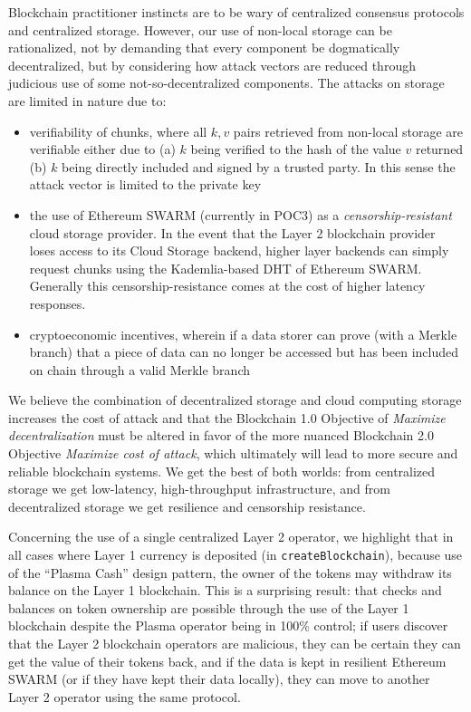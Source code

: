 \documentclass{article}
\begin{document}
Blockchain practitioner instincts are to be wary of centralized consensus protocols and centralized storage.  However, our use of non-local storage can be rationalized, not by demanding that every component be  dogmatically decentralized, but by considering how attack vectors are reduced through judicious use of some not-so-decentralized components.  The attacks on storage are limited in nature due to:
\begin{itemize}
\item verifiability of chunks, where all $k,v$ pairs retrieved from non-local storage are verifiable either due to (a) $k$ being verified to the hash of the value $v$ returned (b) $k$ being directly included and signed by a trusted party.  In this sense the attack vector is limited to the private key
\item the use of Ethereum SWARM (currently in POC3) as a {\em censorship-resistant} cloud storage provider.  In the event that the Layer 2 blockchain provider loses access to its Cloud Storage backend, higher layer backends can simply request chunks using the Kademlia-based DHT of Ethereum SWARM.  Generally this censorship-resistance comes at the cost of higher latency responses.
\item cryptoeconomic incentives, wherein if a data storer can prove (with a Merkle branch) that a piece of data can no longer be accessed but has been included on chain through a valid Merkle branch
\end{itemize}
We believe the combination of decentralized storage and cloud computing storage increases the cost of attack and that the Blockchain 1.0 Objective of {\em Maximize decentralization} must be altered in favor of the more nuanced Blockchain 2.0 Objective {\em Maximize cost of attack}, which ultimately will lead to more secure and reliable blockchain systems.  We get the best of both worlds: from centralized storage we get low-latency, high-throughput infrastructure, and from decentralized storage we get resilience and censorship resistance.

Concerning the use of a single centralized Layer 2 operator, we highlight that in all cases where Layer 1 currency is deposited (in \texttt{createBlockchain}), because use of the ``Plasma Cash'' design pattern, the owner of the tokens may withdraw its balance on the Layer 1 blockchain.  This is a surprising result: that checks and balances on token ownership are possible through the use of the Layer 1 blockchain despite the Plasma operator being in 100\% control; if users discover that the Layer 2 blockchain operators are malicious, they can be certain they can get the value of their tokens back, and if the data is kept in resilient Ethereum SWARM (or if they have kept their data locally), they can move to another Layer 2 operator using  the same protocol.
\end{document}
